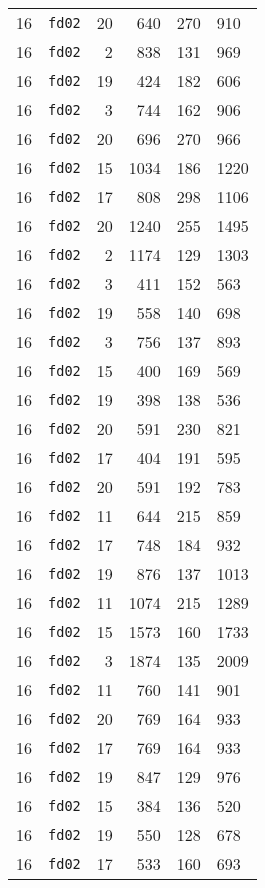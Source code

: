 \documentclass{article}
\begin{document}
\begin{table}[h!]
\begin{tabular}{llrrrl}
    16 & \texttt{fd02} & 20 & 640 & 270 & 910 \\
    16 & \texttt{fd02} & 2 & 838 & 131 & 969 \\
    16 & \texttt{fd02} & 19 & 424 & 182 & 606 \\
    16 & \texttt{fd02} & 3 & 744 & 162 & 906 \\
    16 & \texttt{fd02} & 20 & 696 & 270 & 966 \\
    16 & \texttt{fd02} & 15 & 1034 & 186 & 1220 \\
    16 & \texttt{fd02} & 17 & 808 & 298 & 1106 \\
    16 & \texttt{fd02} & 20 & 1240 & 255 & 1495 \\
    16 & \texttt{fd02} & 2 & 1174 & 129 & 1303 \\
    16 & \texttt{fd02} & 3 & 411 & 152 & 563 \\
    16 & \texttt{fd02} & 19 & 558 & 140 & 698 \\
    16 & \texttt{fd02} & 3 & 756 & 137 & 893 \\
    16 & \texttt{fd02} & 15 & 400 & 169 & 569 \\
    16 & \texttt{fd02} & 19 & 398 & 138 & 536 \\
    16 & \texttt{fd02} & 20 & 591 & 230 & 821 \\
    16 & \texttt{fd02} & 17 & 404 & 191 & 595 \\
    16 & \texttt{fd02} & 20 & 591 & 192 & 783 \\
    16 & \texttt{fd02} & 11 & 644 & 215 & 859 \\
    16 & \texttt{fd02} & 17 & 748 & 184 & 932 \\
    16 & \texttt{fd02} & 19 & 876 & 137 & 1013 \\
    16 & \texttt{fd02} & 11 & 1074 & 215 & 1289 \\
    16 & \texttt{fd02} & 15 & 1573 & 160 & 1733 \\
    16 & \texttt{fd02} & 3 & 1874 & 135 & 2009 \\
    16 & \texttt{fd02} & 11 & 760 & 141 & 901 \\
    16 & \texttt{fd02} & 20 & 769 & 164 & 933 \\
    16 & \texttt{fd02} & 17 & 769 & 164 & 933 \\
    16 & \texttt{fd02} & 19 & 847 & 129 & 976 \\
    16 & \texttt{fd02} & 15 & 384 & 136 & 520 \\
    16 & \texttt{fd02} & 19 & 550 & 128 & 678 \\
    16 & \texttt{fd02} & 17 & 533 & 160 & 693 \\

\end{tabular}
\end{table}
\end{document}
